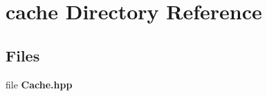 \section{cache Directory Reference}
\label{dir_538dafc855c634b9f6cc516e21dfcdce}
\subsection*{Files}
\begin{DoxyCompactItemize}
\item 
file \textbf{ Cache.\+hpp}
\end{DoxyCompactItemize}
